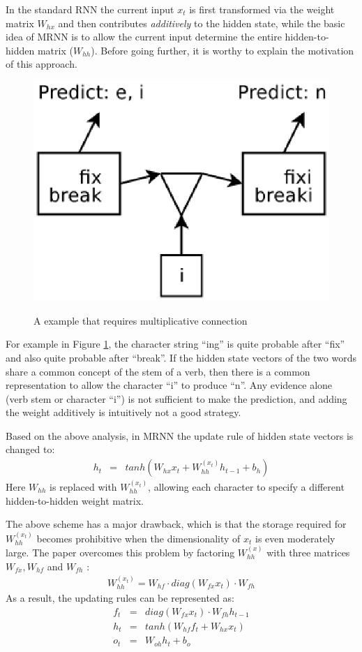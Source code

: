 \documentclass[paper=a4, fontsize=18pt]{article} %
\numberwithin{equation}{section} %
\numberwithin{figure}{section} %
\numberwithin{table}{section} %
\begin{document}
In the standard RNN the current input $x_t$ is first transformed via the weight matrix $W_{hx}$ and then contributes \emph{additively} to the hidden state, while the basic idea of MRNN is to allow the current input determine the entire hidden-to-hidden matrix ($W_{hh}$). Before going further, it is worthy to explain the motivation of this approach.

\begin{figure}[htbp]
  \centering
  \includegraphics[width=.5\linewidth]{8_1_mrnn}\\
  \caption{A example that requires multiplicative connection}\label{fig:mrnn}
\end{figure}

For example in Figure \ref{fig:mrnn}, the character string ``ing'' is quite probable after ``fix'' and also quite probable after ``break''. If the hidden state vectors of the two words share a common concept of the stem of a verb, then there is a common representation to allow the character ``i'' to produce ``n''. Any evidence alone (verb stem or character ``i'') is not sufficient to make the prediction, and adding the weight additively is intuitively not a good strategy.

Based on the above analysis, in MRNN the update rule of hidden state vectors is changed to:
\begin{eqnarray}
h_t &=& tanh(W_{hx}x_t + W^{(x_t)}_{hh}h_{t-1} + b_h)
\end{eqnarray}
Here $W_{hh}$ is replaced with $W_{hh}^{(x_t)}$, allowing each character to specify a different hidden-to-hidden weight matrix.

The above scheme has a major drawback, which is that the storage required for $W_{hh}^{(x_t)}$ becomes prohibitive when the dimensionality of $x_t$ is even moderately large. The paper overcomes this problem by factoring $W_{hh}^{(x)}$ with three matrices $W_{fx}, W_{hf}$ and $W_{fh}$ \cite{Taylor2009Factored}:
\begin{eqnarray}
W_{hh}^{(x_t)} = W_{hf} \cdot diag(W_{fx}x_t) \cdot W_{fh}
\end{eqnarray}
As a result, the updating rules can be represented as:
\begin{eqnarray}
f_t &=& diag(W_{fx}x_t) \cdot W_{fh}h_{t-1}\\
h_t &=& tanh(W_{hf}f_t + W_{hx}x_t)\\
o_t &=& W_{oh}h_t + b_o
\end{eqnarray}
\end{document}

